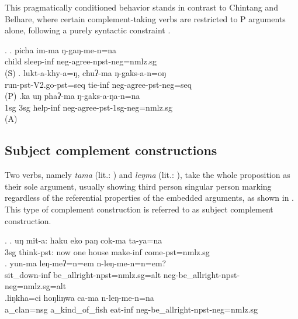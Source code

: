 This pragmatically conditioned behavior stands in contrast to Chintang and Belhare, where certain complement-taking verbs are restricted to P arguments alone, following a purely syntactic constraint \citep{Bickeletal2001Syntactic, Bickeletal2010Ditransitives}. 

\ex. \ag. picha im-ma ŋ-gaŋ-me-n=na\\
child sleep-{\sc inf} {\sc neg}-agree{\sc [3sg]-npst-neg=nmlz.sg}\\
 (S)
\bg. lukt-a-khy-a=ŋ, chuʔ-ma  ŋ-gaks-a-n=oŋ\\
run{\sc [3sg]-pst-V2.go-pst=seq} tie{\sc -inf} {\sc neg-}agree{\sc [3sg]-pst-neg=seq}\\
 (P)  
\bg.ka uŋ phaʔ-ma ŋ-gaks-a-ŋa-n=na\\
{\sc 1sg} {\sc 3sg} help{\sc -inf} {\sc neg-}agree{\sc -pst-1sg-neg=nmlz.sg}\\
 (A)


\subsection{Subject complement constructions}\label{subjectcomplement}

Two verbs, namely \emph{tama}  (lit.: ) and \emph{leŋma}  (lit.: ), take the whole proposition as their sole argument, usually showing third person singular person marking regardless of the referential properties of the embedded arguments, as shown in \Next. This type of complement construction is referred to as subject complement construction.

\ex. \ag. uŋ mit-a:       haku eko paŋ  cok-ma    ta-ya=na\\
	{\sc 3sg} think{\sc [3sg]-pst}: now one house make-{\sc inf} come{\sc [3sg]-pst=nmlz.sg}\\
	 
 	\bg. yun-ma leŋ-meʔ=n=em n-leŋ-me-n=n=em?\\
	sit\_down{\sc -inf} be\_allright{\sc [3sg]-npst=nmlz.sg=alt} {\sc neg-}be\_allright{\sc [3sg]-npst-neg=nmlz.sg=alt}\\
	\bg.liŋkha=ci hoŋliŋwa ca-ma n-leŋ-me-n=na\\
	a\_clan{\sc =nsg} a\_kind\_of\_fish eat{\sc -inf}	{\sc neg-}be\_allright{\sc [3sg]-npst-neg=nmlz.sg}\\ 

